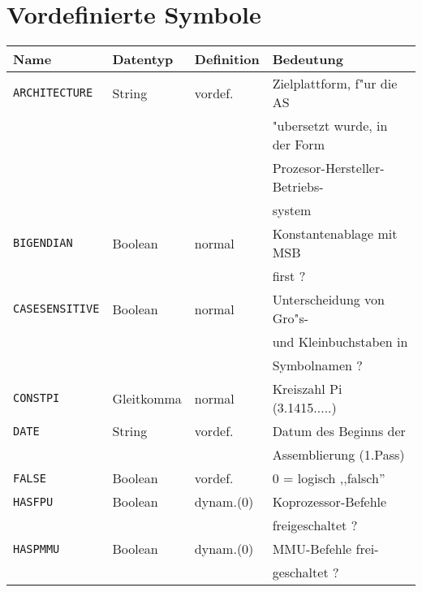\documentclass[12pt,a4paper,twoside]{report}
\newcommand{\tty}[1]{{\tt #1}}
\begin{document}



\cleardoublepage
\chapter{Vordefinierte Symbole}\label{AppInternSyms}

\begin{table*}[ht]
\begin{center}\begin{tabular}{|l|l|l|l|}
\hline
Name             &  Datentyp   & Definition & Bedeutung \\
\hline\hline
\tty{ARCHITECTURE} & String    & vordef.    & Zielplattform, f"ur die AS \\
                 &             &            & "ubersetzt wurde, in der Form \\
                 &             &            & Prozesor-Hersteller-Betriebs- \\
                 &             &            & system \\
\hline
\tty{BIGENDIAN}  &  Boolean    & normal     & Konstantenablage mit MSB \\
                 &             &            & first ? \\
\hline
\tty{CASESENSITIVE} & Boolean  & normal     & Unterscheidung von Gro"s- \\
                 &             &            & und Kleinbuchstaben in \\
                 &             &            & Symbolnamen ? \\
\hline
\tty{CONSTPI}    &  Gleitkomma & normal     & Kreiszahl Pi (3.1415.....) \\
\hline
\tty{DATE}       &  String     & vordef.    & Datum des Beginns der  \\
                 &             &            & Assemblierung (1.Pass) \\
\hline
\tty{FALSE}      &  Boolean    & vordef.    & 0 = logisch ,,falsch'' \\
\hline
\tty{HASFPU}     &  Boolean    & dynam.(0)  & Koprozessor-Befehle \\
                 &             &            & freigeschaltet ? \\
\hline
\tty{HASPMMU}    &  Boolean    & dynam.(0)  & MMU-Befehle frei- \\
                 &             &            & geschaltet ? \\

\end{tabular}
\end{center}
\end{table*}
\end{document}
